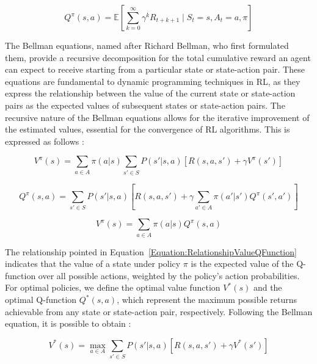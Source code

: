 \begin{equation}
Q^\pi(s, a) = \mathbb{E} \left[ \sum_{k=0}^{\infty} \gamma^k R_{t+k+1} \mid S_t = s, A_t = a, \pi \right]
\end{equation}

The Bellman equations, named after Richard Bellman, who first formulated them, provide a recursive decomposition for the total cumulative reward an agent can expect to receive starting from a particular state or state-action pair. These equations are fundamental to dynamic programming techniques in RL, as they express the relationship between the value of the current state or state-action pairs as the expected values of subsequent states or state-action pairs. The recursive nature of the Bellman equations allows for the iterative improvement of the estimated values, essential for the convergence of RL algorithms. This is expressed as follows \cite{sutton_reinforcement_2018}:

\begin{equation}
V^\pi(s) = \sum_{a \in A} \pi(a|s) \sum_{s' \in S} P(s'|s,a) \left[ R(s,a,s') + \gamma V^\pi(s') \right]
\end{equation}

\begin{equation}
Q^\pi(s, a) = \sum_{s' \in S} P(s'|s,a) \left[ R(s,a,s') + \gamma \sum_{a' \in A} \pi(a'|s') Q^\pi(s', a') \right]
\end{equation}

\begin{equation}
\label{Equation:RelationshipValueQFunction}
V^\pi(s) = \sum_{a \in A} \pi(a|s) Q^\pi(s, a)
\end{equation}

The relationship pointed in Equation~\ref{Equation:RelationshipValueQFunction} indicates that the value of a state under policy \(\pi\) is the expected value of the Q-function over all possible actions, weighted by the policy's action probabilities. For optimal policies, we define the optimal value function \( V^*(s) \) and the optimal Q-function \( Q^*(s, a) \), which represent the maximum possible returns achievable from any state or state-action pair, respectively. Following the Bellman equation, it is possible to obtain \cite{sutton_reinforcement_2018}:

\begin{equation}
V^*(s) = \max_{a \in A} \sum_{s' \in S} P(s'|s,a) \left[ R(s,a,s') + \gamma V^*(s') \right]
\end{equation}


